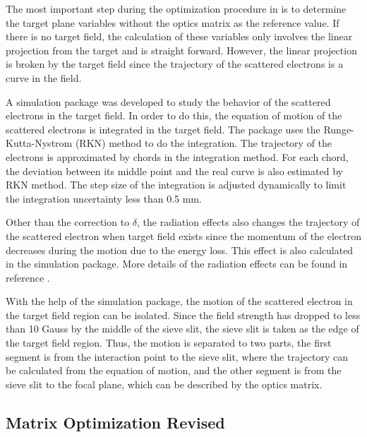 The most important step during the optimization procedure in  is to determine the target plane variables without the optics matrix as the reference value. If there is no target field, the calculation of these variables only involves the linear projection from the target and is straight forward. However, the linear projection is broken by the target field since the trajectory of the scattered electrons is a curve in the field.

A simulation package was developed to study the behavior of the scattered electrons in the target field. In order to do this, the equation of motion of the scattered electrons is integrated in the target field. The package uses the Runge-Kutta-Nystrom (RKN) method to do the integration. The trajectory of the electrons is approximated by chords in the integration method. For each chord, the deviation between its middle point and the real curve is also estimated by RKN method. The step size of the integration is adjusted dynamically to limit the integration uncertainty less than 0.5 mm.

Other than the correction to $\delta$, the radiation effects also changes the trajectory of the scattered electron when target field exists since the momentum of the electron decreases during the motion due to the energy loss. This effect is also calculated in the simulation package. More details of the radiation effects can be found in reference \cite{Liu2015}.

With the help of the simulation package, the motion of the scattered electron in the target field region can be isolated. Since the field strength has dropped to less than 10 Gauss by the middle of the sieve slit, the sieve slit is taken as the edge of the target field region. Thus, the motion is separated to two parts, the first segment is from the interaction point to the sieve slit, where the trajectory can be calculated from the equation of motion, and the other segment is from the sieve slit to the focal plane, which can be described by the optics matrix.

\subsection{Matrix Optimization Revised}
\label{C6S2SS4}

